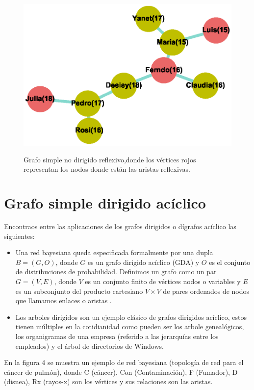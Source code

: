 \documentclass{article}
\begin{document}
  
  
\begin{center}

\end{center}
\begin{figure}[h]
\begin{center}
\includegraphics[scale=0.7]{Graf3_kamada_kawai_layout.eps}\\
\caption{Grafo simple no dirigido reflexivo,donde los vértices rojos representan los nodos donde están las aristas reflexivas.}
\end{center}
\end{figure}
\newpage
\section{Grafo simple dirigido acíclico}
Encontraos entre las aplicaciones de los grafos dirigidos o dígrafos acíclico las siguientes: 
\begin{itemize}
\item Una red bayesiana queda especificada formalmente por una dupla $B= (G, O)$, donde $G$ es un grafo dirigido acíclico (GDA) y $O$ es el conjunto de distribuciones de probabilidad. Definimos un grafo como un par $G= (V, E)$, donde $ V $ es un conjunto finito de vértices nodos o variables y $E$ es un subconjunto del producto cartesiano $V \times V $ de pares ordenados de nodos que llamamos enlaces o aristas \cite{gf2}.
\item Los arboles dirigidos son un ejemplo clásico de grafos dirigidos acíclico, estos tienen múltiples en la cotidianidad como pueden ser los arbole genealógicos, los organigramas de una empresa (referido a las jerarquías entre los empleados) y el árbol de directorios de Windows.

\end{itemize}	
En la figura 4 se muestra un ejemplo de red bayesiana (topología de red para el cáncer de pulmón), donde C (cáncer), Con (Contaminación), F (Fumador), D (disnea), Rx (rayos-x) son los vértices y sus relaciones son las aristas.\linebreak 
\end{document}
